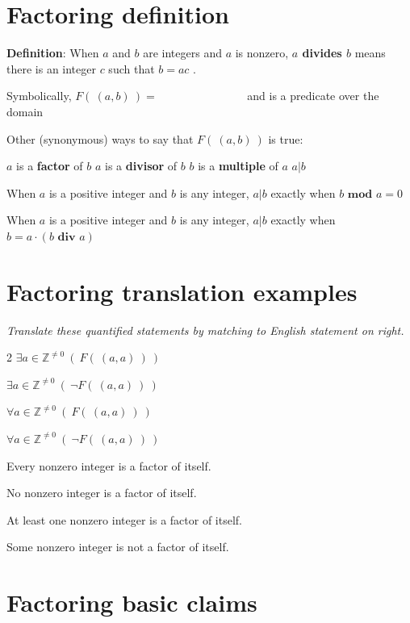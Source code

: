 \documentclass[12pt, oneside]{article}
\begin{document}
\section*{Factoring definition}


{\bf Definition}: When $a$ and $b$ are integers and $a$ is nonzero, 
{\bf $a$ divides $b$} means there is an integer $c$ such that $b = ac$ . 


Symbolically, $F(~(a,b)~) = \phantom{\exists c\in \mathbb{Z}~(b=ac)}$
and is  a predicate over the domain \underline{}


Other (synonymous) ways to say that $F(~(a,b)~)$ is true: 
\begin{center}
$a$ is a {\bf factor} of $b$
\qquad 
$a$ is a {\bf divisor} of $b$
\qquad  $b$ is a {\bf multiple} of $a$
\qquad
$a | b$
\end{center}

When $a$ is a positive integer and $b$ is any integer, $a | b$
exactly when $b \textbf{ mod } a = 0$

When $a$ is a positive integer and $b$ is any integer, $a | b$
exactly when $b = a \cdot (b \textbf{ div } a)$ \vfill
\section*{Factoring translation examples}


{\it Translate these quantified statements by matching to English statement on right.}

\begin{multicols}{2}
$\exists a\in \mathbb{Z}^{\neq 0} ~(~F(~(a,a)~)~)$

$\exists a\in \mathbb{Z}^{\neq 0} ~(~\lnot F(~(a,a)~)~)$

$\forall a\in \mathbb{Z}^{\neq 0} ~(~F(~(a,a)~)~)$

$\forall a\in \mathbb{Z}^{\neq 0} ~(~\lnot F(~(a,a)~)~)$


Every nonzero integer is a factor of itself.

No nonzero integer is a factor of itself.

At least one nonzero integer is a factor of itself.

Some nonzero integer is not a factor of itself.
\end{multicols} \vfill
\section*{Factoring basic claims}
\end{document}
